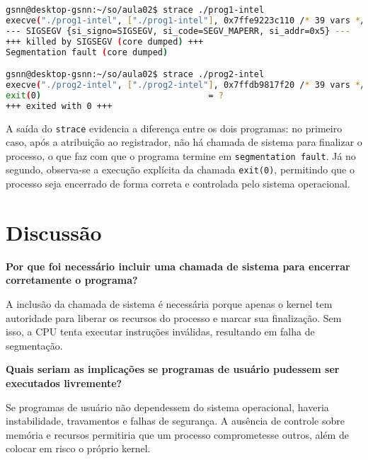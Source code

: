 \documentclass[12pt]{article}
\begin{document}
\begin{lstlisting}[style=modern, language=bash]
gsnn@desktop-gsnn:~/so/aula02$ strace ./prog1-intel 
execve("./prog1-intel", ["./prog1-intel"], 0x7ffe9223c110 /* 39 vars */) = 0
--- SIGSEGV {si_signo=SIGSEGV, si_code=SEGV_MAPERR, si_addr=0x5} ---
+++ killed by SIGSEGV (core dumped) +++
Segmentation fault (core dumped)

gsnn@desktop-gsnn:~/so/aula02$ strace ./prog2-intel 
execve("./prog2-intel", ["./prog2-intel"], 0x7ffdb9817f20 /* 39 vars */) = 0
exit(0)                                 = ?
+++ exited with 0 +++
\end{lstlisting}

A saída do \texttt{strace} evidencia a diferença entre os dois programas: no primeiro caso, 
após a atribuição ao registrador, não há chamada de sistema para finalizar o processo, o que 
faz com que o programa termine em \texttt{segmentation fault}. Já no segundo, observa-se a 
execução explícita da chamada \texttt{exit(0)}, permitindo que o processo seja encerrado de 
forma correta e controlada pelo sistema operacional.



\section*{Discussão}


\textbf{Por que foi necessário incluir uma chamada de sistema para encerrar corretamente o programa?}  

A inclusão da chamada de sistema é necessária porque apenas o kernel tem autoridade para
liberar os recursos do processo e marcar sua finalização. Sem isso, a CPU tenta executar
instruções inválidas, resultando em falha de segmentação.  

\textbf{Quais seriam as implicações se programas de usuário pudessem ser executados livremente?}  

Se programas de usuário não dependessem do sistema operacional, haveria instabilidade,
travamentos e falhas de segurança. A ausência de controle sobre memória e recursos
permitiria que um processo comprometesse outros, além de colocar em risco o próprio kernel.  
\end{document}
